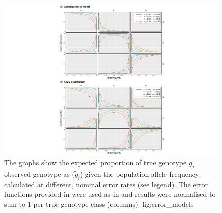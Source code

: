 

\begin{figure}[!htbp]
\includegraphics[width=\textwidth]{./img/ch4/error_models}
{The graphs show the expected proportion of true genotype $g_j$ observed genotype as ($\tilde{g}_i$) given the population allele frequency; calculated at different, nominal error rates (see legend).
The error functions provided in  were used as in  and results were normalised to sum to 1 per true genotype class (columns).}
{fig:error_models}
\end{figure}
